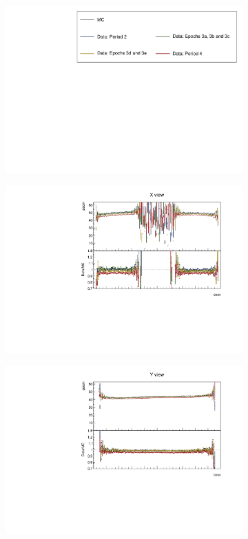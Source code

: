 \documentclass[12pt,a4paper]{article}
\begin{document}
\begin{figure}[h!]
  \begin{subfigure}{\textwidth}
  \centering
    \includegraphics[height=0.2\linewidth]{essentialsec_tb/legend.pdf}
  \end{subfigure}
  \vspace*{2mm}

  \begin{subfigure}{0.5\textwidth}
    \includegraphics[width=\linewidth]{PlotsAngularDistribution/pecm_cosx_x.pdf}
  \end{subfigure}
  \begin{subfigure}{0.5\textwidth}
    \includegraphics[width=\linewidth]{PlotsAngularDistribution/pecm_cosx_y.pdf}

\end{subfigure}
\end{figure}
\end{document}
